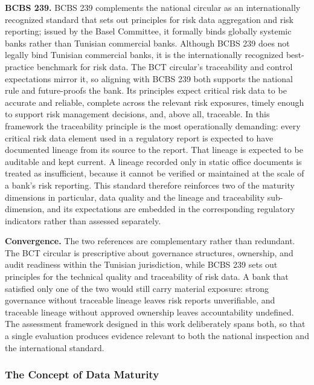 \textbf{BCBS 239.} BCBS 239 complements the national circular as an internationally recognized standard that sets out principles for risk data aggregation and risk reporting; issued by the Basel Committee, it formally binds globally systemic banks rather than Tunisian commercial banks. Although BCBS 239 does not legally bind Tunisian commercial banks, it is the internationally recognized best-practice benchmark for risk data. The BCT circular's traceability and control expectations mirror it, so aligning with BCBS 239 both supports the national rule and future-proofs the bank. Its principles expect critical risk data to be accurate and reliable, complete across the relevant risk exposures, timely enough to support risk management decisions, and, above all, traceable. In this framework the traceability principle is the most operationally demanding: every critical risk data element used in a regulatory report is expected to have documented lineage from its source to the report. That lineage is expected to be auditable and kept current. A lineage recorded only in static office documents is treated as insufficient, because it cannot be verified or maintained at the scale of a bank's risk reporting. This standard therefore reinforces two of the maturity dimensions in particular, data quality and the lineage and traceability sub-dimension, and its expectations are embedded in the corresponding regulatory indicators rather than assessed separately.

\textbf{Convergence.} The two references are complementary rather than redundant. The BCT circular is prescriptive about governance structures, ownership, and audit readiness within the Tunisian jurisdiction, while BCBS 239 sets out principles for the technical quality and traceability of risk data. A bank that satisfied only one of the two would still carry material exposure: strong governance without traceable lineage leaves risk reports unverifiable, and traceable lineage without approved ownership leaves accountability undefined. The assessment framework designed in this work deliberately spans both, so that a single evaluation produces evidence relevant to both the national inspection and the international standard.

\subsubsection{The Concept of Data Maturity}

